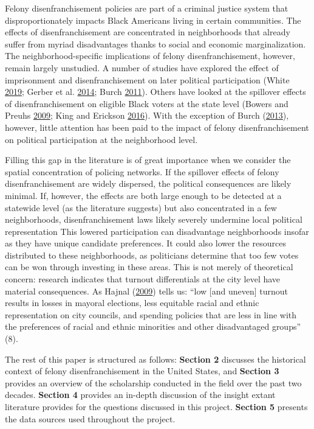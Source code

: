 \documentclass[12pt,]{article}
\begin{document}
Felony disenfranchisement policies are part of a criminal justice system that disproportionately impacts Black Americans living in certain communities. The effects of disenfranchisement are concentrated in neighborhoods that already suffer from myriad disadvantages thanks to social and economic marginalization. The neighborhood-specific implications of felony disenfranchisement, however, remain largely unstudied. A number of studies have explored the effect of imprisonment and disenfranchisement on later political participation (White \protect\hyperlink{ref-White2019}{2019}; Gerber et al. \protect\hyperlink{ref-Gerber2014}{2014}; Burch \protect\hyperlink{ref-Burch2011}{2011}). Others have looked at the spillover effects of disenfranchisement on eligible Black voters at the state level (Bowers and Preuhs \protect\hyperlink{ref-Bowers2009}{2009}; King and Erickson \protect\hyperlink{ref-King2016}{2016}). With the exception of Burch (\protect\hyperlink{ref-Burch2013}{2013}), however, little attention has been paid to the impact of felony disenfranchisement on political participation at the neighborhood level.

Filling this gap in the literature is of great importance when we consider the spatial concentration of policing networks. If the spillover effects of felony disenfranchisement are widely dispersed, the political consequences are likely minimal. If, however, the effects are both large enough to be detected at a statewide level (as the literature suggests) but also concentrated in a few neighborhoods, disenfranchisement laws likely severely undermine local political representation This lowered participation can disadvantage neighborhoods insofar as they have unique candidate preferences. It could also lower the resources distributed to these neighborhoods, as politicians determine that too few votes can be won through investing in these areas. This is not merely of theoretical concern: research indicates that turnout differentials at the city level have material consequences. As Hajnal (\protect\hyperlink{ref-Hajnal2009}{2009}) tells us: ``low {[}and uneven{]} turnout results in losses in mayoral elections, less equitable racial and ethnic representation on city councils, and spending policies that are less in line with the preferences of racial and ethnic minorities and other disadvantaged groups'' (8).

The rest of this paper is structured as follows: \textbf{Section 2} discusses the historical context of felony disenfranchisement in the United States, and \textbf{Section 3} provides an overview of the scholarship conducted in the field over the past two decades. \textbf{Section 4} provides an in-depth discussion of the insight extant literature provides for the questions discussed in this project. \textbf{Section 5} presents the data sources used throughout the project.
\end{document}
